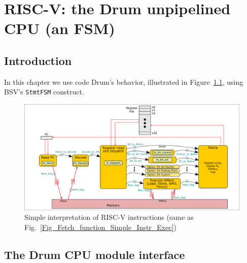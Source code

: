 

\chapter{RISC-V: the Drum unpipelined CPU (an FSM)}


\setcounter{page}{1}
\renewcommand{\thepage}{\arabic{chapter}-\arabic{page}}

\label{ch_Drum_code}


\section{Introduction}

In this chapter we use code Drum's behavior, illustrated in
Figure~\ref{Fig_Drum_Instr_Exec}, using BSV's \verb|StmtFSM|
construct.
\begin{figure}[htbp]
  \centerline{\includegraphics[width=6in,angle=0]{Figures/Fig_Instr_Exec_w_structs}}
  \caption{\label{Fig_Drum_Instr_Exec}
           Simple interpretation of RISC-V instructions
	   (same as Fig.~\ref{Fig_Fetch_function_Simple_Instr_Exec})}
\end{figure}


\section{The Drum CPU module interface}

